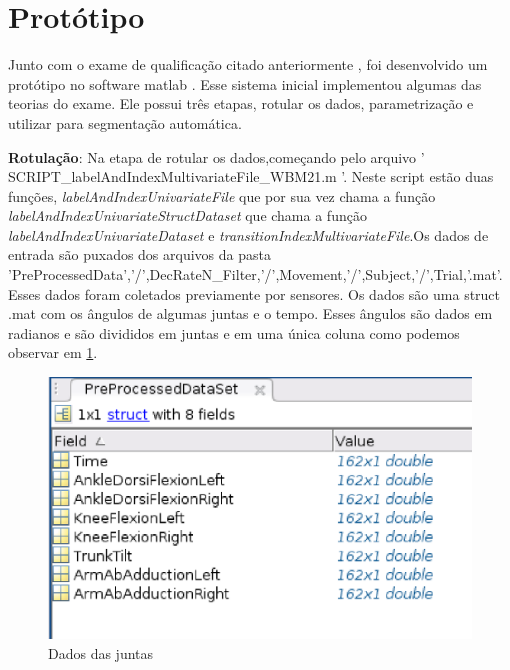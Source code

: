 \section{Protótipo}
\label{Sec:protótipo}
  Junto com o exame de qualificação citado anteriormente \cite{roberto}, foi 
desenvolvido um protótipo no software matlab \cite{matlab}. Esse sistema inicial
implementou algumas das teorias do exame. Ele possui três etapas, rotular os dados,
parametrização e utilizar para segmentação automática.
\begin{itemize}

\begin{sloppypar}

\item \textbf{Rotulação}: Na etapa de rotular os dados,começando pelo arquivo
' SCRIPT\_labelAndIndexMultivariateFile\_WBM21.m '. Neste script estão duas funções, 
\textit{labelAndIndexUnivariateFile} que por sua vez chama a função 
\textit{labelAndIndexUnivariateStructDataset} que chama a função \textit{labelAndIndexUnivariateDataset}
e \textit{transitionIndexMultivariateFile}.Os dados de entrada são puxados dos arquivos da pasta 
'PreProcessedData','/',DecRateN\_Filter,'/',Movement,'/',Subject,'/',Trial,'.mat'.
Esses dados foram coletados previamente por sensores. Os dados são uma struct .mat
com  os ângulos de algumas juntas e o tempo. Esses ângulos são dados em radianos
 e são divididos em juntas e em uma única coluna como podemos observar em \ref{structMatlab}.

\begin{figure}[!h]                                                               
\centering                                                                         
\includegraphics [keepaspectratio=true,scale=0.60]{figuras/structMatlab.eps}                                
\caption{Dados das juntas}                                        
\label{structMatlab}                                                        
\end{figure} 


\end{sloppypar}
\end{itemize}

